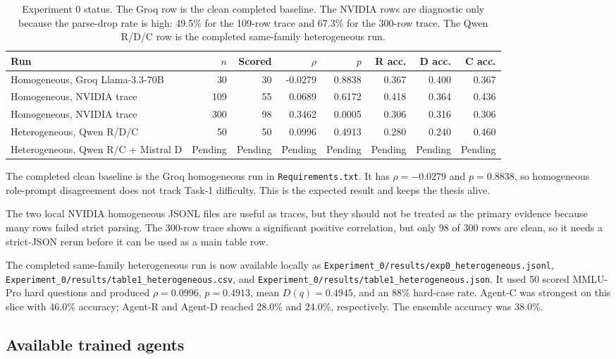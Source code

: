 \documentclass{article}
\begin{document}
\begin{table}[h]
\centering
\begin{tabular}{lrrrrrrr}
\hline
Run & \(n\) & Scored & \(\rho\) & \(p\) & R acc. & D acc. & C acc. \\
\hline
Homogeneous, Groq Llama-3.3-70B & 30 & 30 & -0.0279 & 0.8838 & 0.367 & 0.400 & 0.367 \\
Homogeneous, NVIDIA trace & 109 & 55 & 0.0689 & 0.6172 & 0.418 & 0.364 & 0.436 \\
Homogeneous, NVIDIA trace & 300 & 98 & 0.3462 & 0.0005 & 0.306 & 0.316 & 0.306 \\
Heterogeneous, Qwen R/D/C & 50 & 50 & 0.0996 & 0.4913 & 0.280 & 0.240 & 0.460 \\
Heterogeneous, Qwen R/C + Mistral D & Pending & Pending & Pending & Pending & Pending & Pending & Pending \\
\hline
\end{tabular}
\caption{Experiment 0 status. The Groq row is the clean completed baseline.
The NVIDIA rows are diagnostic only because the parse-drop rate is high:
49.5\% for the 109-row trace and 67.3\% for the 300-row trace. The Qwen
R/D/C row is the completed same-family heterogeneous run.}
\end{table}

The completed clean baseline is the Groq homogeneous run in
\texttt{Requirements.txt}. It has \(\rho=-0.0279\) and \(p=0.8838\), so
homogeneous role-prompt disagreement does not track Task-1 difficulty. This is
the expected result and keeps the thesis alive.

The two local NVIDIA homogeneous JSONL files are useful as traces, but they
should not be treated as the primary evidence because many rows failed strict
parsing. The 300-row trace shows a significant positive correlation, but only
98 of 300 rows are clean, so it needs a strict-JSON rerun before it can be
used as a main table row.

The completed same-family heterogeneous run is now available locally as
\texttt{Experiment\_0/results/exp0\_heterogeneous.jsonl},
\texttt{Experiment\_0/results/table1\_heterogeneous.csv}, and
\texttt{Experiment\_0/results/table1\_heterogeneous.json}. It used 50 scored
MMLU-Pro hard questions and produced \(\rho=0.0996\), \(p=0.4913\), mean
\(D(q)=0.4945\), and an 88\% hard-case rate. Agent-C was strongest on this
slice with 46.0\% accuracy; Agent-R and Agent-D reached 28.0\% and 24.0\%,
respectively. The ensemble accuracy was 38.0\%.

\subsection{Available trained agents}
\end{document}
